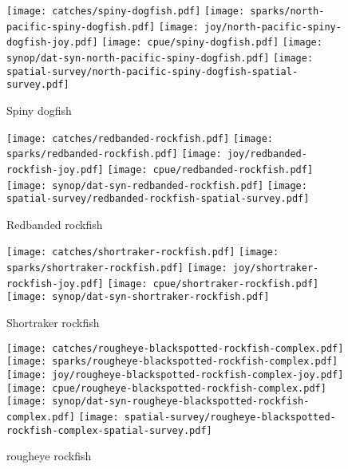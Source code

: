 \documentclass[12pt]{article}
\begin{document}
\begin{landscape}
\begin{figure}[htbp]
  \centering
    \texttt{[image: catches/spiny-dogfish.pdf]}
    \texttt{[image: sparks/north-pacific-spiny-dogfish.pdf]}
    \texttt{[image: joy/north-pacific-spiny-dogfish-joy.pdf]}
  \texttt{[image: cpue/spiny-dogfish.pdf]}
    \texttt{[image: synop/dat-syn-north-pacific-spiny-dogfish.pdf]}
  \texttt{[image: spatial-survey/north-pacific-spiny-dogfish-spatial-survey.pdf]}
    \caption{Spiny dogfish}
\end{figure}

\begin{figure}[htbp]
  \centering
  \texttt{[image: catches/redbanded-rockfish.pdf]}
  \texttt{[image: sparks/redbanded-rockfish.pdf]}
  \texttt{[image: joy/redbanded-rockfish-joy.pdf]}
  \texttt{[image: cpue/redbanded-rockfish.pdf]}
  \texttt{[image: synop/dat-syn-redbanded-rockfish.pdf]}
  \texttt{[image: spatial-survey/redbanded-rockfish-spatial-survey.pdf]}
  \caption{Redbanded rockfish}
\end{figure}

\begin{figure}[htbp]
  \centering
    \texttt{[image: catches/shortraker-rockfish.pdf]}
    \texttt{[image: sparks/shortraker-rockfish.pdf]}
    \texttt{[image: joy/shortraker-rockfish-joy.pdf]}
  \texttt{[image: cpue/shortraker-rockfish.pdf]}
    \texttt{[image: synop/dat-syn-shortraker-rockfish.pdf]}
  \caption{Shortraker rockfish}
\end{figure}

\clearpage 

\begin{figure}[htbp]
  \centering
    \texttt{[image: catches/rougheye-blackspotted-rockfish-complex.pdf]}
    \texttt{[image: sparks/rougheye-blackspotted-rockfish-complex.pdf]}
    \texttt{[image: joy/rougheye-blackspotted-rockfish-complex-joy.pdf]}
  \texttt{[image: cpue/rougheye-blackspotted-rockfish-complex.pdf]}
    \texttt{[image: synop/dat-syn-rougheye-blackspotted-rockfish-complex.pdf]}
    \texttt{[image: spatial-survey/rougheye-blackspotted-rockfish-complex-spatial-survey.pdf]}
  \caption{rougheye rockfish}
\end{figure}



\end{landscape}
\end{document}
